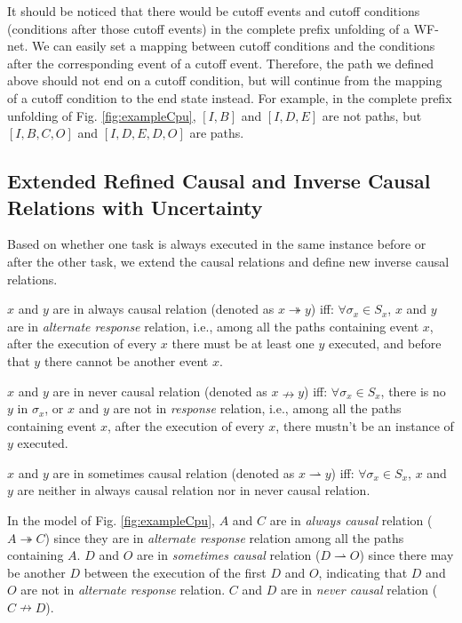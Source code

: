 \documentclass{llncs}
\begin{document}
It should be noticed that there would be cutoff events and cutoff conditions (conditions after those cutoff events) in the complete prefix unfolding of a WF-net. We can easily set a mapping between cutoff conditions and the conditions after the corresponding event of a cutoff event. Therefore, the path we defined above should not end on a cutoff condition, but will continue from the mapping of a cutoff condition to the end state instead. For example, in the complete prefix unfolding of Fig. \ref{fig:exampleCpu}, $[I,B]$ and $[I,D,E]$ are not paths, but $[I,B,C,O]$ and $[I,D,E,D,O]$ are paths.

\subsection{Extended Refined Causal and Inverse Causal Relations with Uncertainty}\label{subsec:causalAndInverseCausal}
Based on whether one task is always executed in the same instance before or after the other task, we extend the causal relations and define new inverse causal relations.

\begin{definition}\label{def:alwaysCausal}
$x$ and $y$ are in always causal relation (denoted as $x\twoheadrightarrow y$) iff: $\forall\sigma_{x}\in S_{x}$, $x$ and $y$ are in \textit{alternate response} relation, i.e., among all the paths containing event $x$, after the execution of every $x$ there must be at least one $y$ executed, and before that $y$ there cannot be another event $x$.
\end{definition}

\begin{definition}\label{def:neverCausal}
$x$ and $y$ are in never causal relation (denoted as $x\nrightarrow y$) iff: $\forall\sigma_{x}\in S_{x}$, there is no $y$ in $\sigma_{x}$, or $x$ and $y$ are not in \textit{response} relation, i.e., among all the paths containing event $x$, after the execution of every $x$, there mustn't be an instance of $y$ executed.
\end{definition}

\begin{definition}\label{def:sometimesCausal}
$x$ and $y$ are in sometimes causal relation (denoted as $x\rightharpoonup y$) iff: $\forall\sigma_{x}\in S_{x}$, $x$ and $y$ are neither in always causal relation nor in never causal relation.
\end{definition}

\begin{example}\label{ex:causalRelation}
In the model of Fig. \ref{fig:exampleCpu}, $A$ and $C$ are in \textit{always causal} relation ($A\twoheadrightarrow C$) since they are in \textit{alternate response} relation among all the paths containing $A$. $D$ and $O$ are in \textit{sometimes causal} relation ($D\rightharpoonup O$) since there may be another $D$ between the execution of the first $D$ and $O$, indicating that $D$ and $O$ are not in \textit{alternate response} relation. $C$ and $D$ are in \textit{never causal} relation ($C\nrightarrow D$).
\end{example}
\end{document}
